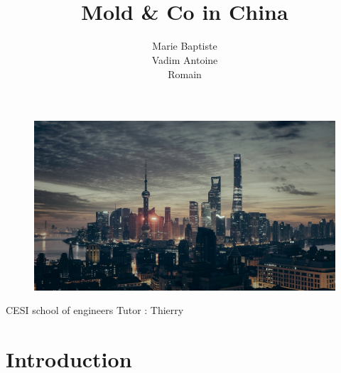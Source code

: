 \documentclass{article}
\begin{document}
\begin{titlepage}
\begin{figure}
\end{figure}

\title{ \\ \vspace{2cm} \bf{Mold \& Co in China} \vspace{1cm} \\
}
\begin{figure}
\begin{center}
\includegraphics[scale = 0.5]{Img/china-illustration.jpg}
\end{center}
\end{figure}
\author{\Large{Marie } \Large{Baptiste  } \\\Large{Vadim  } \Large{Antoine  } \\\Large{Romain  }}
\date{}
\vfill 
\end{titlepage}
\maketitle
\vspace{5.5cm}
\Large{CESI school of engineers} \hfill \Large{Tutor : Thierry }
\thispagestyle{empty}
\setcounter{page}{0}
\newpage

\renewcommand{\contentsname}{\Huge{Table of contents}}
\tableofcontents

\newpage
\renewcommand{\listfigurename}{\Huge{List of figures}}
\listoffigures

\newpage

\section{Introduction}
\end{document}
